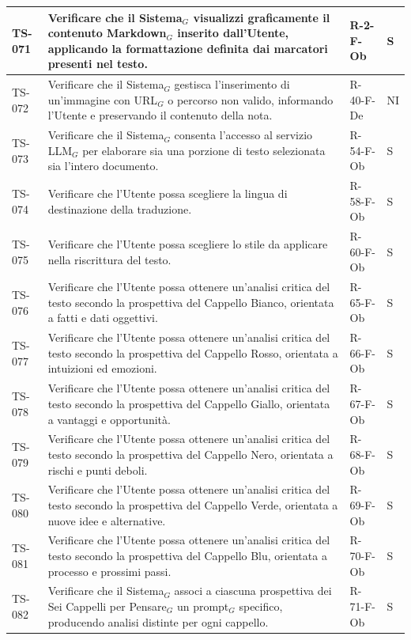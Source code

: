 \documentclass[a4paper, 10pt, colorlinks=true, linkcolor=black, urlcolor=blue, citecolor=blue, hidelinks]{article}
\begin{document}
\begin{longtable}{|p{1.4cm}|p{7.8cm}|p{2.3cm}|p{1.2cm}|}
    TS-071 & Verificare che il Sistema$_G$ visualizzi graficamente il contenuto Markdown$_G$ inserito dall'Utente, applicando la formattazione definita dai marcatori presenti nel testo. & R-2-F-Ob & S \\
    \hline
    TS-072 & Verificare che il Sistema$_G$ gestisca l'inserimento di un'immagine con URL$_G$ o percorso non valido, informando l'Utente e preservando il contenuto della nota. & R-40-F-De & NI \\
    \hline
    TS-073 & Verificare che il Sistema$_G$ consenta l'accesso al servizio LLM$_G$ per elaborare sia una porzione di testo selezionata sia l'intero documento. & R-54-F-Ob & S \\
    \hline
    TS-074 & Verificare che l'Utente possa scegliere la lingua di destinazione della traduzione. & R-58-F-Ob & S \\
    \hline
    TS-075 & Verificare che l'Utente possa scegliere lo stile da applicare nella riscrittura del testo. & R-60-F-Ob & S \\
    \hline
    TS-076 & Verificare che l'Utente possa ottenere un'analisi critica del testo secondo la prospettiva del Cappello Bianco, orientata a fatti e dati oggettivi. & R-65-F-Ob & S \\
    \hline
    TS-077 & Verificare che l'Utente possa ottenere un'analisi critica del testo secondo la prospettiva del Cappello Rosso, orientata a intuizioni ed emozioni. & R-66-F-Ob & S \\
    \hline
    TS-078 & Verificare che l'Utente possa ottenere un'analisi critica del testo secondo la prospettiva del Cappello Giallo, orientata a vantaggi e opportunità. & R-67-F-Ob & S \\
    \hline
    TS-079 & Verificare che l'Utente possa ottenere un'analisi critica del testo secondo la prospettiva del Cappello Nero, orientata a rischi e punti deboli. & R-68-F-Ob & S \\
    \hline
    TS-080 & Verificare che l'Utente possa ottenere un'analisi critica del testo secondo la prospettiva del Cappello Verde, orientata a nuove idee e alternative. & R-69-F-Ob & S \\
    \hline
    TS-081 & Verificare che l'Utente possa ottenere un'analisi critica del testo secondo la prospettiva del Cappello Blu, orientata a processo e prossimi passi. & R-70-F-Ob & S \\
    \hline
    TS-082 & Verificare che il Sistema$_G$ associ a ciascuna prospettiva dei Sei Cappelli per Pensare$_G$ un prompt$_G$ specifico, producendo analisi distinte per ogni cappello. & R-71-F-Ob & S \\

\end{longtable}
\end{document}
